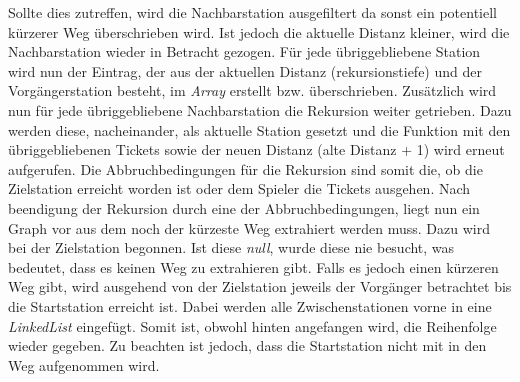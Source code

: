                     Sollte dies zutreffen, wird die Nachbarstation ausgefiltert da sonst ein potentiell kürzerer Weg überschrieben wird.
                    Ist jedoch die aktuelle Distanz kleiner, wird die Nachbarstation wieder in Betracht gezogen.
                    Für jede übriggebliebene Station wird nun der Eintrag, der aus der aktuellen Distanz (rekursionstiefe) und der Vorgängerstation besteht,
                    im \textit{Array} erstellt bzw. überschrieben.
                    Zusätzlich wird nun für jede übriggebliebene Nachbarstation die Rekursion weiter getrieben.
                    Dazu werden diese, nacheinander, als aktuelle Station gesetzt und die Funktion mit den übriggebliebenen Tickets
                    sowie der neuen Distanz (alte Distanz + 1) wird erneut aufgerufen.
                    \newline
                    Die Abbruchbedingungen für die Rekursion sind somit die,
                    ob die Zielstation erreicht worden ist oder dem Spieler die Tickets ausgehen.
                    \newline
                    \newline
                    Nach beendigung der Rekursion durch eine der Abbruchbedingungen, liegt nun ein Graph vor aus dem
                    noch der kürzeste Weg extrahiert werden muss.
                    Dazu wird bei der Zielstation begonnen. Ist diese \textit{null}, wurde diese nie besucht, was bedeutet,
                    dass es keinen Weg zu extrahieren gibt.
                    Falls es jedoch einen kürzeren Weg gibt, wird ausgehend von der Zielstation jeweils der Vorgänger betrachtet bis
                    die Startstation erreicht ist.
                    Dabei werden alle Zwischenstationen vorne in eine \textit{LinkedList} eingefügt. Somit ist, obwohl hinten angefangen wird,
                    die Reihenfolge wieder gegeben. Zu beachten ist jedoch, dass die Startstation nicht mit in den Weg aufgenommen wird.

